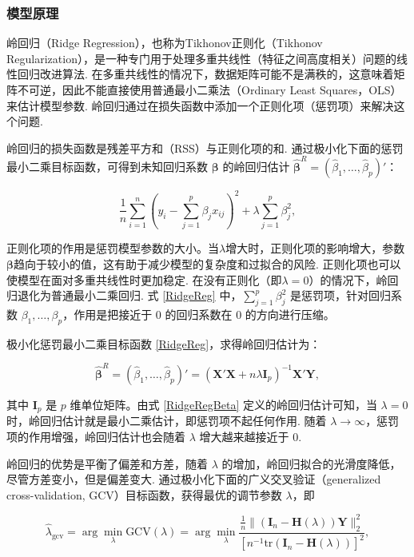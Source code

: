 \documentclass[12pt, a4paper, oneside]{ctexart}
\begin{document}
	\subsubsection{模型原理}
	岭回归（Ridge Regression），也称为Tikhonov正则化（Tikhonov Regularization），是一种专门用于处理多重共线性（特征之间高度相关）问题的线性回归改进算法. 在多重共线性的情况下，数据矩阵可能不是满秩的，这意味着矩阵不可逆，因此不能直接使用普通最小二乘法（Ordinary Least Squares，OLS）来估计模型参数. 岭回归通过在损失函数中添加一个正则化项（惩罚项）来解决这个问题.
	
	岭回归的损失函数是残差平方和（RSS）与正则化项的和. 通过极小化下面的惩罚最小二乘目标函数，可得到未知回归系数 $\bm{\beta}$ 的岭回归估计 $\bm{\hat{\beta}}^{R} = (\hat{\beta}_1, \dots, \hat{\beta}_p)'$：
	
	\begin{equation}
		\frac{1}{n} \sum_{i=1}^{n} \left( y_i - \sum_{j=1}^{p} \beta_j x_{ij} \right)^2 + \lambda \sum_{j=1}^{p} \beta_j^2, \label{RidgeReg}
	\end{equation}
	
	 正则化项的作用是惩罚模型参数的大小。当$\lambda$增大时，正则化项的影响增大，参数$\bm{\beta}$趋向于较小的值，这有助于减少模型的复杂度和过拟合的风险. 正则化项也可以使模型在面对多重共线性时更加稳定. 在没有正则化（即$\lambda=0$）的情况下，岭回归退化为普通最小二乘回归.
	式 \eqref{RidgeReg} 中，$\sum_{j=1}^{p} \beta_j^2$ 是惩罚项，针对回归系数 $\beta_1, \dots, \beta_p$，作用是把接近于 $0$ 的回归系数在 $0$ 的方向进行压缩。
	
	极小化惩罚最小二乘目标函数 \eqref{RidgeReg}，求得岭回归估计为：
	
	\begin{equation}
		\bm{\hat{\beta}}^R = (\hat{\beta}_1, \dots, \hat{\beta}_p)' = (\bm{X}'\bm{X} + n\lambda \bm{I}_p)^{-1} \bm{X}'\bm{Y}, \label{RidgeRegBeta}
	\end{equation}
	
	其中 $\bm{I}_p$ 是 $p$ 维单位矩阵。由式 \eqref{RidgeRegBeta} 定义的岭回归估计可知，当 $\lambda = 0$ 时，岭回归估计就是最小二乘估计，即惩罚项不起任何作用. 随着 $\lambda \to \infty$，惩罚项的作用增强，岭回归估计也会随着 $\lambda$ 增大越来越接近于 $0$.
	
	岭回归的优势是平衡了偏差和方差，随着 $\lambda$ 的增加，岭回归拟合的光滑度降低，尽管方差变小，但是偏差变大. 通过极小化下面的广义交叉验证（generalized cross-validation, GCV）目标函数，获得最优的调节参数 $\lambda$，即
	
	\begin{equation}
		\hat{\lambda}_{\text{gcv}} = \arg \min_{\lambda} \text{GCV}(\lambda) = \arg \min_{\lambda}  \frac{ \frac{1}{n}\| (\bm{I}_n - \bm{H}(\lambda))\bm{Y} \|_2^2 }{ [n^{-1}\text{tr}(\bm{I}_n - \bm{H}(\lambda))]^2 }, \label{gcv}
	\end{equation}
	
\end{document}
